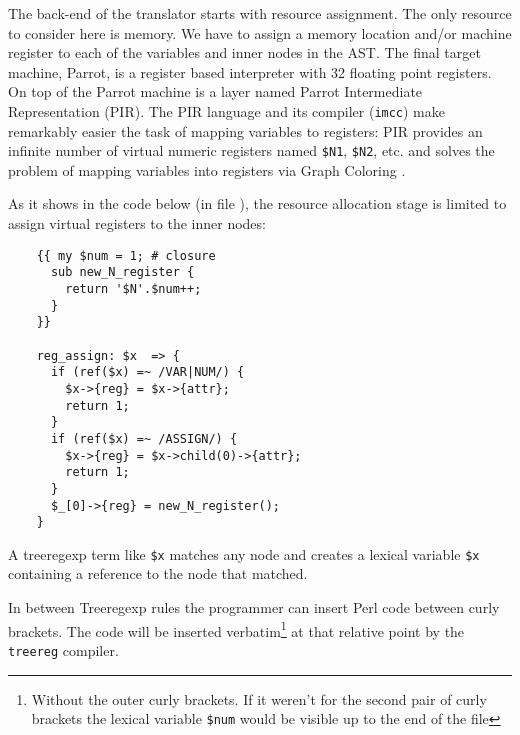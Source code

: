 The back-end of the translator starts with resource assignment.
The only resource to consider here is memory. We have to assign
a memory location and/or machine register to each of the variables and inner nodes
in the AST. The final target machine, Parrot, is a register based 
interpreter with 32 floating point registers. On top of the Parrot
machine is a layer named Parrot Intermediate Representation (PIR).
The PIR language and its compiler (\verb|imcc|) make remarkably easier 
the task of mapping variables to registers:
PIR provides an infinite number of virtual
numeric registers named \verb|$N1|, \verb|$N2|, etc. and solves
the problem of mapping variables into registers via Graph Coloring
\cite{briggs98register}.

As it shows in the code below (in file ), 
the resource allocation stage
is limited to assign virtual registers
to the inner nodes:

\begin{verbatim}
    {{ my $num = 1; # closure
      sub new_N_register {
        return '$N'.$num++;
      }
    }}

    reg_assign: $x  => {
      if (ref($x) =~ /VAR|NUM/) {
        $x->{reg} = $x->{attr};
        return 1;
      }
      if (ref($x) =~ /ASSIGN/) {
        $x->{reg} = $x->child(0)->{attr};
        return 1;
      }
      $_[0]->{reg} = new_N_register();
    }
\end{verbatim}

A treeregexp term like \verb|$x| matches any node
and creates a lexical variable \verb|$x|
containing a reference to the node that matched.

In between Treeregexp rules the programmer can insert 
Perl code between curly brackets. 
The code will be inserted verbatim\footnote{Without 
the outer curly brackets.
If it weren't for the second pair of curly brackets
the lexical variable {\tt \$num} would be visible
up to the end of the file
} at that relative point by the \verb|treereg|
compiler. 

